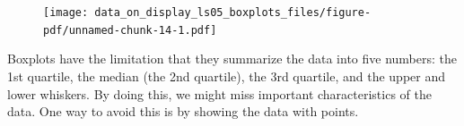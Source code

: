 \documentclass[
  letterpaper,
  DIV=11,
  numbers=noendperiod]{scrreprt}
\begin{document}
\begin{figure}[H]

{\centering \texttt{[image: data\_on\_display\_ls05\_boxplots\_files/figure-pdf/unnamed-chunk-14-1.pdf]}

}

\end{figure}

\begin{tcolorbox}[enhanced jigsaw, colframe=quarto-callout-note-color-frame, colbacktitle=quarto-callout-note-color!10!white, titlerule=0mm, opacitybacktitle=0.6, breakable, toprule=.15mm, arc=.35mm, rightrule=.15mm, colback=white, bottomrule=.15mm, opacityback=0, toptitle=1mm, left=2mm, bottomtitle=1mm, title=\textcolor{quarto-callout-note-color}{\faInfo}\hspace{0.5em}{Key Point}, leftrule=.75mm, coltitle=black]

Boxplots have the limitation that they summarize the data into five
numbers: the 1st quartile, the median (the 2nd quartile), the 3rd
quartile, and the upper and lower whiskers. By doing this, we might miss
important characteristics of the data. One way to avoid this is by
showing the data with points.

\end{tcolorbox}
\end{document}
